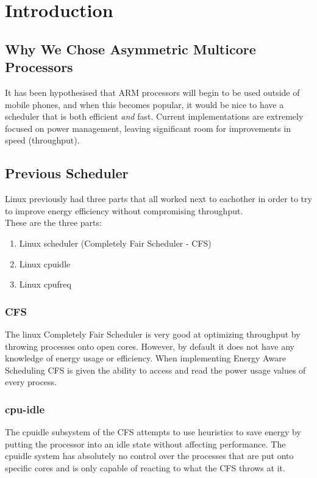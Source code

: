 \section{Introduction}
\subsection{Why We Chose Asymmetric Multicore Processors}
It has been hypothesised that ARM processors will begin to be used outside of mobile phones, and when this becomes popular, it would be nice to have a scheduler that is both efficient \textit{and} fast. Current implementations are extremely focused on power management, leaving significant room for improvements in speed (throughput).

\subsection{Previous Scheduler}
Linux previously had three parts that all worked next to eachother in order to try to improve energy efficiency without compromising throughput.\\
These are the three parts:
\begin{enumerate} 
    \item Linux scheduler (Completely Fair Scheduler - CFS)
    \item Linux cpuidle
    \item Linux cpufreq
\end{enumerate}

\subsubsection{CFS}
The linux Completely Fair Scheduler is very good at optimizing throughput by throwing processes onto open cores. However, by default it does not have any knowledge of energy usage or efficiency. When implementing Energy Aware Scheduling CFS is given the ability to access and read the power usage values of every process.\cite{EAS2015}

\subsubsection{cpu-idle}
The cpuidle subsystem of the CFS attempts to use heuristics to save energy by putting the processor into an idle state without affecting performance. The cpuidle system has absolutely no control over the processes that are put onto specific cores and is only capable of reacting to what the CFS throws at it. \cite{EAS2015}

